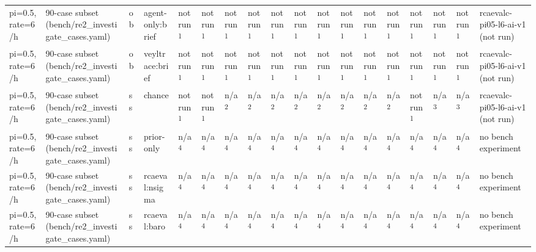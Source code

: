 \begin{table}[t]
\begin{tabular}{llllllllllllllllll}
pi=0.5, rate=6/h & 90-case subset (bench/re2\_investigate\_cases.yaml) & ob & agent-only:brief & not run\textsuperscript{1} & not run\textsuperscript{1} & not run\textsuperscript{1} & not run\textsuperscript{1} & not run\textsuperscript{1} & not run\textsuperscript{1} & not run\textsuperscript{1} & not run\textsuperscript{1} & not run\textsuperscript{1} & not run\textsuperscript{1} & not run\textsuperscript{1} & not run\textsuperscript{1} & not run\textsuperscript{1} & rcaevalc-pi05-l6-ai-v1 (not run) \\
pi=0.5, rate=6/h & 90-case subset (bench/re2\_investigate\_cases.yaml) & ob & veyltrace:brief & not run\textsuperscript{1} & not run\textsuperscript{1} & not run\textsuperscript{1} & not run\textsuperscript{1} & not run\textsuperscript{1} & not run\textsuperscript{1} & not run\textsuperscript{1} & not run\textsuperscript{1} & not run\textsuperscript{1} & not run\textsuperscript{1} & not run\textsuperscript{1} & not run\textsuperscript{1} & not run\textsuperscript{1} & rcaevalc-pi05-l6-ai-v1 (not run) \\
pi=0.5, rate=6/h & 90-case subset (bench/re2\_investigate\_cases.yaml) & ss & chance & not run\textsuperscript{1} & not run\textsuperscript{1} & n/a\textsuperscript{2} & n/a\textsuperscript{2} & n/a\textsuperscript{2} & n/a\textsuperscript{2} & n/a\textsuperscript{2} & n/a\textsuperscript{2} & n/a\textsuperscript{2} & n/a\textsuperscript{2} & not run\textsuperscript{1} & n/a\textsuperscript{3} & n/a\textsuperscript{3} & rcaevalc-pi05-l6-ai-v1 (not run) \\
pi=0.5, rate=6/h & 90-case subset (bench/re2\_investigate\_cases.yaml) & ss & prior-only & n/a\textsuperscript{4} & n/a\textsuperscript{4} & n/a\textsuperscript{4} & n/a\textsuperscript{4} & n/a\textsuperscript{4} & n/a\textsuperscript{4} & n/a\textsuperscript{4} & n/a\textsuperscript{4} & n/a\textsuperscript{4} & n/a\textsuperscript{4} & n/a\textsuperscript{4} & n/a\textsuperscript{4} & n/a\textsuperscript{4} & no bench experiment \\
pi=0.5, rate=6/h & 90-case subset (bench/re2\_investigate\_cases.yaml) & ss & rcaeval:nsigma & n/a\textsuperscript{4} & n/a\textsuperscript{4} & n/a\textsuperscript{4} & n/a\textsuperscript{4} & n/a\textsuperscript{4} & n/a\textsuperscript{4} & n/a\textsuperscript{4} & n/a\textsuperscript{4} & n/a\textsuperscript{4} & n/a\textsuperscript{4} & n/a\textsuperscript{4} & n/a\textsuperscript{4} & n/a\textsuperscript{4} & no bench experiment \\
pi=0.5, rate=6/h & 90-case subset (bench/re2\_investigate\_cases.yaml) & ss & rcaeval:baro & n/a\textsuperscript{4} & n/a\textsuperscript{4} & n/a\textsuperscript{4} & n/a\textsuperscript{4} & n/a\textsuperscript{4} & n/a\textsuperscript{4} & n/a\textsuperscript{4} & n/a\textsuperscript{4} & n/a\textsuperscript{4} & n/a\textsuperscript{4} & n/a\textsuperscript{4} & n/a\textsuperscript{4} & n/a\textsuperscript{4} & no bench experiment \\

\end{tabular}
\end{table}
